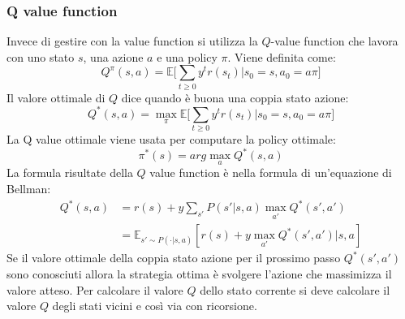 		\subsubsection{Q value function}
		Invece di gestire con la value function si utilizza la $Q$-value function che lavora con uno stato $s$, una azione $a$ e una policy $\pi$.
		Viene definita come:
		$$Q^\pi(s,a) = \mathbb{E}\biggl[\sum\limits_{t\ge 0} y^tr(s_t)|s_0 = s,a_0 = a\pi\biggr]$$
		Il valore ottimale di $Q$ dice quando \`e buona una coppia stato azione:
		$$Q^*(s,a) =\max_\pi\mathbb{E}\biggl[\sum\limits_{t\ge 0} y^tr(s_t)|s_0 = s,a_0 = a\pi\biggr]$$
		La Q value ottimale viene usata per computare la policy ottimale:
		$$\pi^*(s) = arg\max_aQ^*(s,a)$$
		La formula risultate della $Q$ value function \`e nella formula di un'equazione di Bellman:
		\begin{align*}
			Q^*(s,a) &= r(s) + y\sum\limits_{s'}P(s'|s,a)\max_{a'}Q^*(s',a')\\
			&=\mathbb{E}_{s'\sim P(\cdot|s,a)}[r(s)+y\max_{a'}Q^*(s',a')|s,a]
		\end{align*}
		Se il valore ottimale della coppia stato azione per il prossimo passo $Q^*(s',a')$ sono conosciuti allora la strategia ottima \`e svolgere l'azione che massimizza il valore atteso.
		Per calcolare il valore $Q$ dello stato corrente si deve calcolare il valore $Q$ degli stati vicini e cos\`i via con ricorsione.
		
